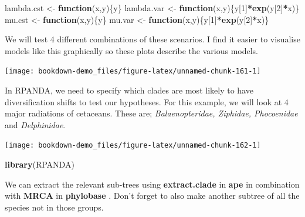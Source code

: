 \documentclass[
]{book}
\newenvironment{Shaded}{\begin{snugshade}}{\end{snugshade}}
\newcommand{\ControlFlowTok}[1]{\textcolor[rgb]{0.13,0.29,0.53}{\textbf{#1}}}
\newcommand{\DecValTok}[1]{\textcolor[rgb]{0.00,0.00,0.81}{#1}}
\newcommand{\KeywordTok}[1]{\textcolor[rgb]{0.13,0.29,0.53}{\textbf{#1}}}
\newcommand{\NormalTok}[1]{#1}
\newcommand{\OperatorTok}[1]{\textcolor[rgb]{0.81,0.36,0.00}{\textbf{#1}}}
\newcommand{\StringTok}[1]{\textcolor[rgb]{0.31,0.60,0.02}{#1}}
\begin{document}
\begin{Shaded}
\begin{Highlighting}[]
\NormalTok{lambda.cst \textless{}{-}}\StringTok{ }\ControlFlowTok{function}\NormalTok{(x,y)\{y\}}
\NormalTok{lambda.var \textless{}{-}}\StringTok{ }\ControlFlowTok{function}\NormalTok{(x,y)\{y[}\DecValTok{1}\NormalTok{]}\OperatorTok{*}\KeywordTok{exp}\NormalTok{(y[}\DecValTok{2}\NormalTok{]}\OperatorTok{*}\NormalTok{x)\}}
\NormalTok{mu.cst \textless{}{-}}\StringTok{ }\ControlFlowTok{function}\NormalTok{(x,y)\{y\}}
\NormalTok{mu.var \textless{}{-}}\StringTok{ }\ControlFlowTok{function}\NormalTok{(x,y)\{y[}\DecValTok{1}\NormalTok{]}\OperatorTok{*}\KeywordTok{exp}\NormalTok{(y[}\DecValTok{2}\NormalTok{]}\OperatorTok{*}\NormalTok{x)\}}
\end{Highlighting}
\end{Shaded}

We will test 4 different combinations of these scenarios. I find it easier to visualise models like this graphically so these plots describe the various models.

\begin{center}\texttt{[image: bookdown-demo\_files/figure-latex/unnamed-chunk-161-1]} \end{center}

In RPANDA, we need to specify which clades are most likely to have diversification shifts to test our hypotheses. For this example, we will look at 4 major radiations of cetaceans. These are; \emph{Balaenopteridae, Ziphidae, Phocoenidae} and \emph{Delphinidae}.

\begin{center}\texttt{[image: bookdown-demo\_files/figure-latex/unnamed-chunk-162-1]} \end{center}

\begin{Shaded}
\begin{Highlighting}[]
\KeywordTok{library}\NormalTok{(RPANDA)}
\end{Highlighting}
\end{Shaded}

We can extract the relevant sub-trees using \textbf{extract.clade} in \textbf{ape} \citep{ape} in combination with \textbf{MRCA} in \textbf{phylobase} \citep{phylobase}. Don't forget to also make another subtree of all the species not in those groups.
\end{document}
